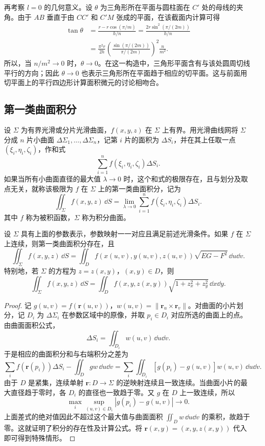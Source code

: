 再考察 $l=0$ 的几何意义。设 $\theta$ 为三角形所在平面与圆柱面在 $C'$ 处的母线的夹角。由于 $AB$ 垂直于由 $CC'$ 和 $C'M$ 张成的平面，在该截面内计算可得
\begin{align*}
\tan\theta
&=\frac{r-r\cos(\pi/m)}{h/n}
=\frac{2r\sin^2(\pi/(2m))}{h/n}\\
&=\frac{\pi^2r}{2h}
\left(\frac{\sin(\pi/(2m))}{\pi/(2m)}\right)^2\frac{n}{m^2}.
\end{align*}
所以，当 $n/m^2\to0$ 时，$\theta\to0$。在这一构造中，三角形平面含有与该处圆周切线平行的方向；因此 $\theta\to0$ 也表示三角形所在平面趋于相应的切平面。这与前面用切平面上的平行四边形计算面积微元的讨论相吻合。


\subsection*{第一类曲面积分}
\begin{definition}
设 $\Sigma$ 为有界光滑或分片光滑曲面，$f(x,y,z)$ 在 $\Sigma$ 上有界。用光滑曲线网将 $\Sigma$ 分成 $n$ 片小曲面 $\Delta\Sigma_1,\ldots,\Delta\Sigma_n$，记第 $i$ 片的面积为 $\Delta S_i$，并在其上任取一点 $(\xi_i,\eta_i,\zeta_i)$，作和式
\[
\sum_{i=1}^n f(\xi_i,\eta_i,\zeta_i)\Delta S_i.
\]
如果当所有小曲面直径的最大值 $\lambda\to0$ 时，这个和式的极限存在，且与划分及取点无关，就称该极限为 $f$ 在 $\Sigma$ 上的第一类曲面积分，记为
\[
\displaystyle\iint_\Sigma f(x,y,z)\,\dd S
=\lim_{\lambda\to0}\sum_{i=1}^n f(\xi_i,\eta_i,\zeta_i)\Delta S_i.
\]
其中 $f$ 称为被积函数，$\Sigma$ 称为积分曲面。
\end{definition}

设 $\Sigma$ 具有上面的参数表示，参数映射一一对应且满足前述光滑条件。如果 $f$ 在 $\Sigma$ 上连续，则第一类曲面积分存在，且
\[
\displaystyle\iint_\Sigma f(x,y,z)\,\dd S
=\displaystyle\iint_D f(x(u,v),y(u,v),z(u,v))\sqrt{EG-F^2}\,\dd u\dd v.
\]
特别地，若 $\Sigma$ 的方程为 $z=z(x,y)$，$(x,y)\in D$，则
\[
\displaystyle\iint_\Sigma f(x,y,z)\,\dd S
=\displaystyle\iint_D f(x,y,z(x,y))\sqrt{1+z_x^2+z_y^2}\,\dd x\dd y.
\]

\begin{proof}
记 $g(u,v)=f(\boldsymbol r(u,v))$，$w(u,v)=\lVert\boldsymbol r_u\times\boldsymbol r_v\rVert$。对曲面的小片划分，记 $D_i$ 为 $\Delta\Sigma_i$ 在参数区域中的原像，并取 $p_i\in D_i$ 对应所选的曲面上的点。由曲面面积公式，
\[
\Delta S_i=\displaystyle\iint_{D_i}w(u,v)\,\dd u\dd v.
\]
于是相应的曲面积分和与右端积分之差为
\[
\sum_i f(\boldsymbol r(p_i))\Delta S_i
-\displaystyle\iint_D gw\,\dd u\dd v
=\sum_i\displaystyle\iint_{D_i}[g(p_i)-g(u,v)]w(u,v)\,\dd u\dd v.
\]
由于 $D$ 是紧集，连续单射 $\boldsymbol r:D\to\Sigma$ 的逆映射连续且一致连续。当曲面小片的最大直径趋于零时，各 $D_i$ 的直径也一致趋于零。又 $g$ 在 $D$ 上一致连续，所以
\[
\max_i\sup_{(u,v)\in D_i}|g(p_i)-g(u,v)|\longrightarrow0.
\]
上面差式的绝对值因此不超过这个最大值与曲面面积
$\displaystyle\iint_Dw\,\dd u\dd v$ 的乘积，故趋于零。这就证明了积分的存在性及计算公式。将 $\boldsymbol r(x,y)=(x,y,z(x,y))$ 代入即可得到特殊情形。
\end{proof}
